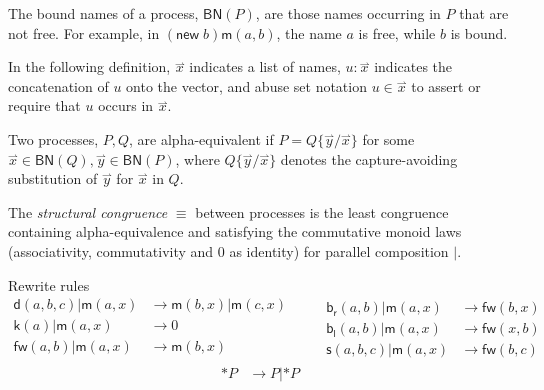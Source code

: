 \documentclass{llncs}
\newcommand{\new}{\mathsf{new}}
\newcommand{\pzero}{\mathbin{0}}
\newcommand{\scong}{\mathbin{\equiv}}
\newcommand{\boundnames}[1]{\mathbin{\mathsf{BN}(#1)}}
\newcommand{\red}{\rightarrow}
\newcommand{\vect}[1]{\stackrel{\rightharpoonup}{#1}}
\begin{document}
The bound names of a process, $\boundnames{P}$, are those names occurring in $P$
that are not free. For example, in $(\new\; b)\mathsf{m}(a,b)$, the name $a$ is free, while $b$ is bound.

In the following definition, $\vect{x}$ indicates a list of names,
$u:\vect{x}$ indicates the concatenation of $u$ onto the vector, and
abuse set notation $u \in \vect{x}$ to assert or require that $u$
occurs in $\vect{x}$.

\begin{definition}
Two processes, $P,Q$, are alpha-equivalent if $P = Q\{\vect{y}/\vect{x}\}$ for
some $\vect{x} \in \boundnames{Q},\vect{y} \in \boundnames{P}$, where $Q\{\vect{y}/\vect{x}\}$
denotes the capture-avoiding substitution of $\vect{y}$ for $\vect{x}$ in $Q$.
\end{definition}

\begin{definition}
  The {\em structural congruence} $\equiv$
  between processes \cite{SangiorgiWalker} is the least congruence containing
  alpha-equivalence and satisfying the commutative monoid laws
  (associativity, commutativity and $\pzero$ as identity) for parallel
  composition $|$.
\end{definition}

Rewrite rules
\[\begin{array}{rl}
  \mathsf{d}(a,b,c) | \mathsf{m}(a,x) & \red \mathsf{m}(b,x) | \mathsf{m}(c,x) \\
  \mathsf{k}(a) | \mathsf{m}(a,x) & \red 0 \\
  \mathsf{fw}(a,b) | \mathsf{m}(a,x) & \red \mathsf{m}(b,x) \\
\end{array} \quad \quad
\begin{array}{rl}
  \mathsf{b}_{\mathsf{r}}(a,b) | \mathsf{m}(a,x) & \red \mathsf{fw}(b,x) \\
  \mathsf{b}_{\mathsf{l}}(a,b) | \mathsf{m}(a,x) & \red \mathsf{fw}(x,b) \\
  \mathsf{s}(a,b,c) | \mathsf{m}(a,x) & \red \mathsf{fw}(b,c)
\end{array}\]
\[\begin{array}{rl}
  \mathsf{*}P & \red P|\mathsf{*}P \\
\end{array}\]
\end{document}
